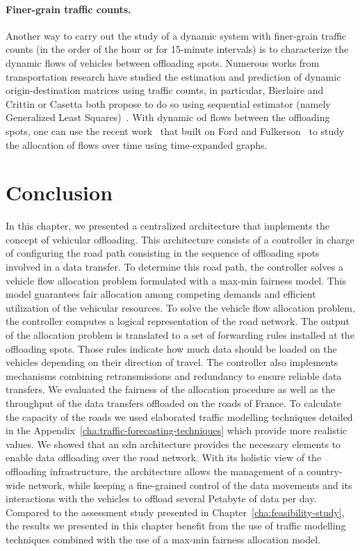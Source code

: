 \paragraph{Finer-grain traffic counts.}
Another way to carry out the study of a dynamic system with finer-grain traffic counts (\eg in the order of the hour or for 15-minute intervals) is to characterize the dynamic flows of vehicles between offloading spots. Numerous works from transportation research have studied the estimation and prediction of dynamic origin-destination matrices using traffic counts, in particular, Bierlaire and Crittin or Casetta \etal both propose to do so using sequential estimator (namely Generalized Least Squares)~\cite{bierlaire2004efficient,cascetta1993dynamic}. With dynamic \acrshort{od} flows between the offloading spots, one can use the recent work~\cite{fleischer2007quickest} that built on Ford and Fulkerson~\cite{ford2015flows} to study the allocation of flows over time using time-expanded graphs. 

\section{Conclusion}
\label{sec:throughput-max-model-conclusions}

In this chapter, we presented a centralized architecture that implements the concept of vehicular offloading. This architecture consists of a controller in charge of configuring the road path consisting in the sequence of offloading spots involved in a data transfer. To determine this road path, the controller solves a vehicle flow allocation problem formulated with a max-min fairness model. This model guarantees fair allocation among competing demands and efficient utilization of the vehicular resources. To solve the vehicle flow allocation problem, the controller computes a logical representation of the road network. The output of the allocation problem is translated to a set of forwarding rules installed at the offloading spots. Those rules indicate how much data should be loaded on the vehicles depending on their direction of travel. The controller also implements mechanisms combining retransmissions and redundancy to ensure reliable data transfers. We evaluated the fairness of the allocation procedure as well as the throughput of the data transfers offloaded on the roads of France. To calculate the capacity of the roads we used elaborated traffic modelling techniques detailed in the Appendix~\ref{cha:traffic-forecasting-techniques} which provide more realistic values. 
We showed that an \acrshort{sdn} architecture provides the necessary elements to enable data offloading over the road network. With its holistic view of the offloading infrastructure, the architecture allows the management of a country-wide network, while keeping a fine-grained control of the data movements and its interactions with the vehicles to offload several Petabyte of data per day. Compared to the assessment study presented in Chapter~\ref{cha:feasibility-study}, the results we presented in this chapter benefit from the use of traffic modelling techniques combined with the use of a max-min fairness allocation model.
